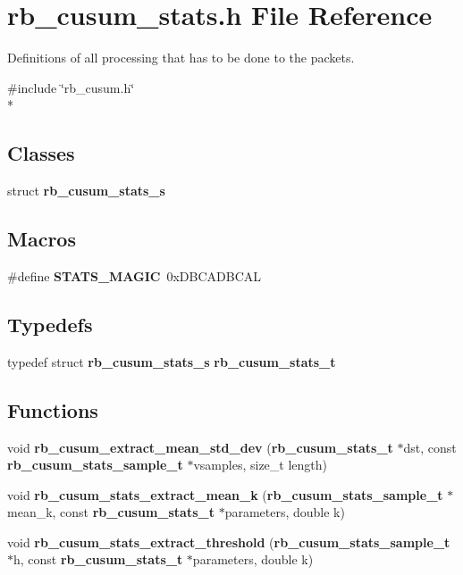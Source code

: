 \section{rb\+\_\+cusum\+\_\+stats.\+h File Reference}
\label{rb__cusum__stats_8h}


Definitions of all processing that has to be done to the packets.  


{\ttfamily \#include \char`\"{}rb\+\_\+cusum.\+h\char`\"{}}\\*
\subsection*{Classes}
\begin{DoxyCompactItemize}
\item 
struct {\bf rb\+\_\+cusum\+\_\+stats\+\_\+s}
\end{DoxyCompactItemize}
\subsection*{Macros}
\begin{DoxyCompactItemize}
\item 
\#define {\bf S\+T\+A\+T\+S\+\_\+\+M\+A\+G\+I\+C}~0x\+D\+B\+C\+A\+D\+B\+C\+A\+L
\end{DoxyCompactItemize}
\subsection*{Typedefs}
\begin{DoxyCompactItemize}
\item 
typedef struct {\bf rb\+\_\+cusum\+\_\+stats\+\_\+s} {\bf rb\+\_\+cusum\+\_\+stats\+\_\+t}
\end{DoxyCompactItemize}
\subsection*{Functions}
\begin{DoxyCompactItemize}
\item 
void {\bf rb\+\_\+cusum\+\_\+extract\+\_\+mean\+\_\+std\+\_\+dev} ({\bf rb\+\_\+cusum\+\_\+stats\+\_\+t} $\ast$dst, const {\bf rb\+\_\+cusum\+\_\+stats\+\_\+sample\+\_\+t} $\ast$vsamples, size\+\_\+t length)
\item 
void {\bf rb\+\_\+cusum\+\_\+stats\+\_\+extract\+\_\+mean\+\_\+k} ({\bf rb\+\_\+cusum\+\_\+stats\+\_\+sample\+\_\+t} $\ast$mean\+\_\+k, const {\bf rb\+\_\+cusum\+\_\+stats\+\_\+t} $\ast$parameters, double k)
\item 
void {\bf rb\+\_\+cusum\+\_\+stats\+\_\+extract\+\_\+threshold} ({\bf rb\+\_\+cusum\+\_\+stats\+\_\+sample\+\_\+t} $\ast$h, const {\bf rb\+\_\+cusum\+\_\+stats\+\_\+t} $\ast$parameters, double k)
\end{DoxyCompactItemize}


